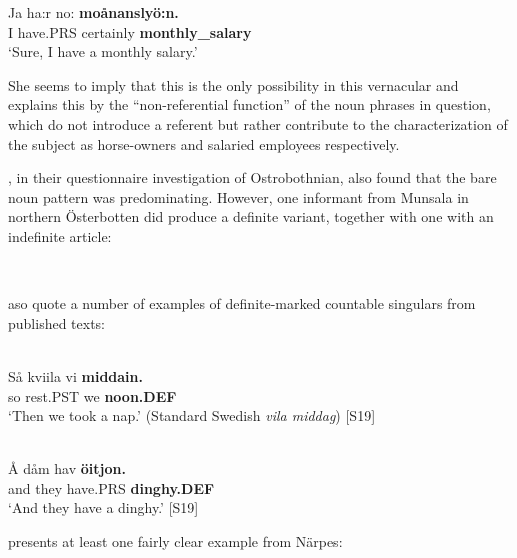 \z

\ea
\gll Ja  ha:r  no:  \textbf{moånanslyö:n.}\\
I  have.PRS  certainly  \textbf{monthly\_salary}\\
\glt ‘Sure, I have a monthly salary.’

\z

She seems to imply that this is the only possibility in this vernacular and explains this by the “non-referential function” of the noun phrases in question, which do not introduce a referent but rather contribute to the characterization of the subject as horse-owners and salaried employees respectively. 

\citet{ErikssonEtAl1999}, in their questionnaire investigation of Ostrobothnian, also found that the bare noun pattern was predominating. However, one informant from Munsala in northern Österbotten did produce a definite variant, together with one with an indefinite article:

\ea 
{}\\
	\z 
\z

\citet{ErikssonEtAl1999} aso quote a number of examples of definite-marked countable singulars from published texts:

\ea \label{} 
\\
\gll Så  kviila  vi  \textbf{middain.} \\
so  rest.PST  we  \textbf{noon.DEF} \\
\glt ‘Then we took a nap.’ (Standard Swedish \textit{vila middag}) [S19]

\z

\ea \label{} 
\\
\gll Å  dåm  hav  \textbf{öitjon.}\\
and  they  have.PRS  \textbf{dinghy.DEF}\\
\glt ‘And they have a dinghy.’ [S19]

\z

\citet{Ivars2005} presents at least one fairly clear example from Närpes:

